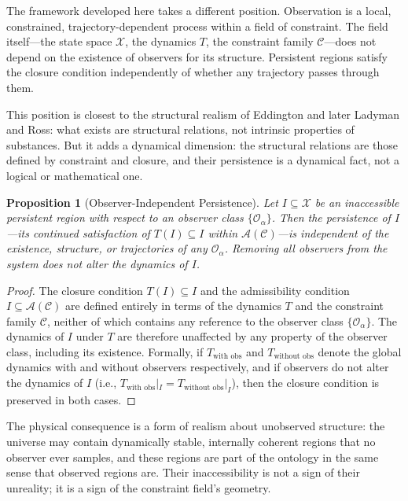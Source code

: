 \documentclass[12pt, a4paper, oneside]{article}
\theoremstyle{plain}
\newtheorem{proposition}[theorem]{Proposition}
\theoremstyle{definition}
\theoremstyle{remark}
\newcommand{\X}{\mathcal{X}}
\newcommand{\C}{\mathcal{C}}
\newcommand{\Obs}{\mathcal{O}}
\newcommand{\A}{\mathcal{A}}
\newcommand{\T}{T}
\begin{document}
The framework developed here takes a different position. Observation is a local, constrained, trajectory-dependent process within a field of constraint. The field itself---the state space $\X$, the dynamics $\T$, the constraint family $\C$---does not depend on the existence of observers for its structure. Persistent regions satisfy the closure condition independently of whether any trajectory passes through them.

This position is closest to the structural realism of Eddington and later Ladyman and Ross: what exists are structural relations, not intrinsic properties of substances. But it adds a dynamical dimension: the structural relations are those defined by constraint and closure, and their persistence is a dynamical fact, not a logical or mathematical one.

\begin{proposition}[Observer-Independent Persistence]
Let $I \subseteq \X$ be an inaccessible persistent region with respect to an observer class $\{\Obs_\alpha\}$. Then the persistence of $I$---its continued satisfaction of $\T(I) \subseteq I$ within $\A(\C)$---is independent of the existence, structure, or trajectories of any $\Obs_\alpha$. Removing all observers from the system does not alter the dynamics of $I$.
\end{proposition}

\begin{proof}
The closure condition $\T(I) \subseteq I$ and the admissibility condition $I \subseteq \A(\C)$ are defined entirely in terms of the dynamics $\T$ and the constraint family $\C$, neither of which contains any reference to the observer class $\{\Obs_\alpha\}$. The dynamics of $I$ under $\T$ are therefore unaffected by any property of the observer class, including its existence. Formally, if $\T_{\text{with obs}}$ and $\T_{\text{without obs}}$ denote the global dynamics with and without observers respectively, and if observers do not alter the dynamics of $I$ (i.e., $\T_{\text{with obs}}|_I = \T_{\text{without obs}}|_I$), then the closure condition is preserved in both cases.
\end{proof}

The physical consequence is a form of realism about unobserved structure: the universe may contain dynamically stable, internally coherent regions that no observer ever samples, and these regions are part of the ontology in the same sense that observed regions are. Their inaccessibility is not a sign of their unreality; it is a sign of the constraint field's geometry.
\end{document}
